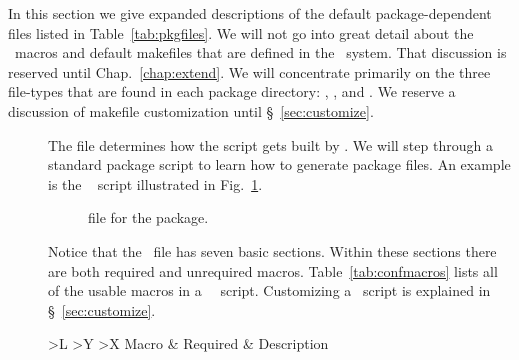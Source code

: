 In this section we give expanded descriptions of the default
package-dependent files listed in Table~\ref{tab:pkgfiles}.  We will
not go into great detail about the \autoconf\ macros and default
makefiles that are defined in the \draco\ system.  That discussion is
reserved until Chap.~\ref{chap:extend}.  We will concentrate primarily
on the three file-types that are found in each package directory:
, , and
.  We reserve a discussion of makefile
customization until \S~\ref{sec:customize}.
\begin{description}
\item[] The
   file determines how the  script
  gets built by \autoconf.  We will step through a standard package
   script to learn how to generate package
   files.  An example is the \cfour\ 
   script illustrated in Fig.~\ref{fig:c4-in}.
  \begin{figure}
    \begin{center}
      
    \end{center}
    \caption{ file for the  package.}
    \label{fig:c4-in}
  \end{figure}
  Notice that the \confin\ file has seven basic sections.  Within
  these sections there are both required and unrequired macros.
  Table~\ref{tab:confmacros} lists all of the usable macros in a
  \draco\ \confin\ script.  Customizing a \confin\ script is explained 
  in \S~\ref{sec:customize}.
  \begin{table}
    \caption{Macros used by the \confin\ scripts.  Macros that require 
      arguments are indicated by \comp{()} following the macro name.
      Note that some macros take the literal argument \comp{pkg},
      while some macros require the package name \vble{pkg}.  Examples 
      of these are \comp{AC\_MPI\_SETUP(pkg)} and
      .}
    \label{tab:confmacros}
    \begin{center}
      \begin{tabularx}{\linewidth}{
          >{\setlength{\hsize}{.7\hsize}}L %
          >{\setlength{\hsize}{.3\hsize}}Y %
          >{\setlength{\hsize}{2.\hsize}}X}
        \hline\hline
        {\normalfont Macro} & Required & Description\\ \hline
         \\ \hline 

\end{tabularx}
\end{center}
\end{table}
\end{description}
